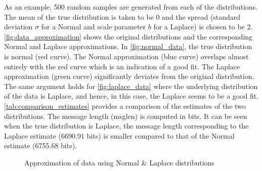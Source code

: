\documentclass[wcp]{jmlr}
\begin{document}
As an example, 500 random samples are generated from each of the distributions.
The mean of the true distribution is taken to be 0 and the spread (standard
deviation $\sigma$ for a Normal and scale parameter $b$ for a Laplace) is
chosen to be 2. \autoref{fig:data_approximation} shows the original distributions
and the corresponding Normal and Laplace approximations. In \autoref{fig:normal_data},
the true distribution is normal (red curve). The Normal approximation (blue curve)
overlaps almost entirely with the red curve which is an indication of a good fit.
The Laplace approximation (green curve) significantly deviates from the original
distribution. The same argument holds for \autoref{fig:laplace_data} where the
underlying distribution of the data is Laplace, and hence, in this case, the Laplace
seems to be a good fit. \\

\autoref{tab:comparison_estimates} provides a comparison of the estimates of the
two distributions. The message length (msglen) is computed in bits. It can be seen
when the true distribution is Laplace, the message length corresponding to the Laplace 
estimate (6690.91 bits) is smaller compared to that of the Normal estimate (6755.68 bits).

\begin{figure}[!htb]
  \centering
    \hspace{0.5cm}
    \caption{Approximation of data using Normal \& Laplace distributions}
    \label{fig:data_approximation}
\end{figure}
\end{document}
